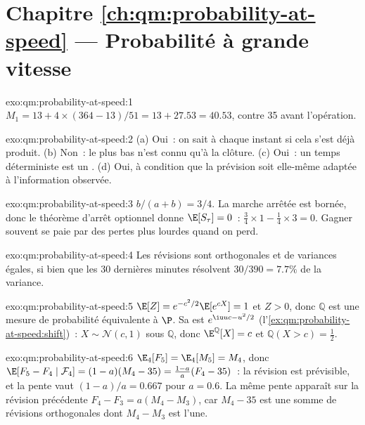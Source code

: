 \section*{Chapitre \ref{ch:qm:probability-at-speed} --- Probabilité à grande vitesse}

\begin{solution}{exo:qm:probability-at-speed:1}
$M_1 = 13 + 4 \times (364 - 13)/51 = 13 + 27.53 = 40.53$, contre 35 avant l'opération.
\end{solution}

\begin{solution}{exo:qm:probability-at-speed:2}
(a) Oui~: on sait à chaque instant si cela s'est déjà produit. (b) Non~: le plus bas n'est connu qu'à
la clôture. (c) Oui~: un temps déterministe est un . (d) Oui, à condition que la prévision soit
elle-même adaptée à l'information observée.
\end{solution}

\begin{solution}{exo:qm:probability-at-speed:3}
$b/(a+b) = 3/4$. La marche arrêtée est bornée, donc le théorème d'arrêt optionnel donne $\E[S_\tau] = 0$~:
$\tfrac34 \times 1 - \tfrac14 \times 3 = 0$. Gagner souvent se paie par des pertes plus lourdes
quand on perd.
\end{solution}

\begin{solution}{exo:qm:probability-at-speed:4}
Les révisions sont orthogonales et de variances égales, si bien que les 30 dernières minutes résolvent $30/390 =
7.7\%$ de la variance.
\end{solution}

\begin{solution}{exo:qm:probability-at-speed:5}
$\E[Z] = e^{-c^2/2}\E[e^{cX}] = 1$ et $Z > 0$, donc $\mathbb Q$ est une mesure de
probabilité équivalente à $\P$. Sa  est $e^{\iu uc - u^2/2}$
(l'\cref{ex:qm:probability-at-speed:shift})~: $X \sim \mathcal N(c,1)$ sous $\mathbb Q$, donc
$\E^{\mathbb Q}[X] = c$ et $\mathbb Q(X > c) = \tfrac12$.
\end{solution}

\begin{solution}{exo:qm:probability-at-speed:6}
$\E_4[F_5] = \E_4[M_5] = M_4$, donc $\E[F_5 - F_4 \mid \mathcal F_4] = (1 - a)(M_4 - 35) = \frac{1 -
a}{a}(F_4 - 35)$~: la révision est prévisible, et la pente vaut $(1 - a)/a = 0.667$ pour $a = 0.6$.
La même pente apparaît sur la révision précédente $F_4 - F_3 = a(M_4 - M_3)$, car $M_4 - 35$ est une
somme de révisions orthogonales dont $M_4 - M_3$ est l'une.
\end{solution}

